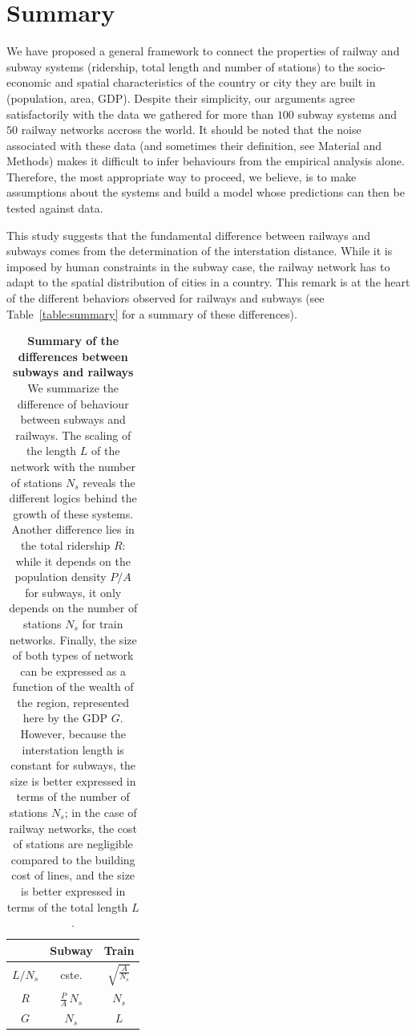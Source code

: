 \section{Summary}

We have proposed a general framework to connect the properties of railway and
subway systems (ridership, total length and number of stations) to the
socio-economic and spatial characteristics of the country or city they are built
in (population, area, GDP). Despite their simplicity, our arguments agree
satisfactorily with the data we gathered for more than $100$ subway systems and
$50$ railway networks accross the world. It should be noted that the noise
associated with these data (and sometimes their definition, see Material and
Methods) makes it difficult to infer behaviours from the empirical analysis
alone. Therefore, the most appropriate way to proceed, we believe, is to make
assumptions about the systems and build a model whose predictions can then be
tested against data.

This study suggests that the fundamental difference between railways and subways
comes from the determination of the interstation distance. While it is imposed
by human constraints in the subway case, the railway network has to adapt to the
spatial distribution of cities in a country. This remark is at the heart of the
different behaviors observed for railways and subways (see
Table~\ref{table:summary} for a summary of these differences). 

\begin{table}[!ht]
\centering
\begin{tabular}{|c|c|c|}
\hline
 & {\bf Subway} & {\bf Train} \\
 \hline
$L / N_s$ & cste. & $\sqrt{\frac{A}{N_s}}$\\
$R$ & $\frac{P}{A}\,N_s$ & $N_s$ \\
$G$ & $N_s$ & $L$ \\
\hline
\end{tabular}
\caption{{\bf Summary of the differences between subways and railways}
We summarize the difference of behaviour between subways and railways. The
scaling of the length $L$ of the network with the number of stations $N_s$
reveals the different logics behind the growth of these systems. Another
difference lies in the total ridership $R$: while it depends on the population
density $P/A$ for subways, it only depends on the number of stations $N_s$ for
train networks. Finally, the size of both types of network can be expressed as a
function of the wealth of the region, represented here by the GDP $G$. However,
because the interstation length is constant for subways, the size is better
expressed in terms of the number of stations $N_s$; in the case of railway
networks, the cost of stations are negligible compared to the building cost of
lines, and the size is better expressed in terms of the total length $L$.
\label{table:summary}} 
\label{tab:label} 
\end{table}

